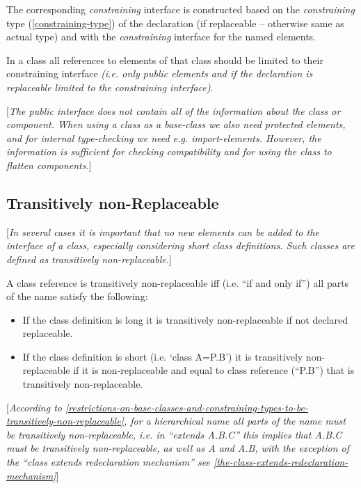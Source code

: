 \documentclass[10pt,a4paper]{report}
\def\doublelabel#1{\label{#1}\hypertarget{#1}{}}
\begin{document}
The corresponding \emph{constraining} interface is constructed based on
the \emph{constraining} type (\ref{constraining-type}) of the declaration (if
replaceable -- otherwise same as actual type) and with the
\emph{constraining} interface for the named elements.

In a class all references to elements of that class should be limited to
their constraining interface \emph{(i.e. only public elements and if the
declaration is replaceable limited to the constraining interface)}.

{[}\emph{The public interface does not contain all of the information
about the class or component. When using a class as a base-class we also
need protected elements, and for internal type-checking we need e.g.
import-elements. However, the information is sufficient for checking
compatibility and for using the class to flatten components.}{]}

\subsection{Transitively non-Replaceable}\doublelabel{transitively-non-replaceable}

{[}\emph{In several cases it is important that no new elements can be
added to the interface of a class, especially considering short class
definitions. Such classes are defined as transitively
non-replaceable.}{]}

A class reference is transitively non-replaceable iff (i.e. ``if and
only if'') all parts of the name satisfy the following:

\begin{itemize}
\item
  If the class definition is long it is transitively non-replaceable if
  not declared replaceable.
\item
  If the class definition is short (i.e. `class A=P.B') it is
  transitively non-replaceable if it is non-replaceable and equal to
  class reference (``P.B'') that is transitively non-replaceable.
\end{itemize}

{[}\emph{According to \ref{restrictions-on-base-classes-and-constraining-types-to-be-transitively-non-replaceable}, for a hierarchical name all
parts of the name must be transitively non-replaceable, i.e. in
``extends A.B.C'' this implies that A.B.C must be transitively
non-replaceable, as well as A and A.B, with the exception of the ``class
extends redeclaration mechanism'' see \ref{the-class-extends-redeclaration-mechanism}}{]}
\end{document}
